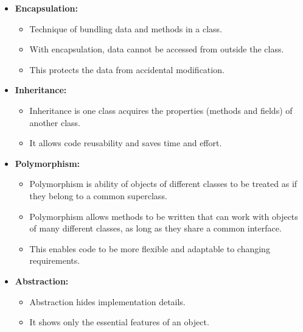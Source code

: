 

\begin{flushleft}
	
	\begin{itemize}
		\item \textbf{Encapsulation:}
		\begin{itemize}
			\item Technique of bundling data and methods in a class. 
			\item With encapsulation, data cannot be accessed from outside the class. 
			\item This protects the data from accidental modification.
			
		\end{itemize}
		
		\item \textbf{Inheritance:}
		\begin{itemize}
			\item Inheritance is one class acquires the properties (methods and fields) of another class.
			\item It allows code reusability and saves time and effort.
		\end{itemize}
	
		\newpage
		\item \textbf{Polymorphism: }
		\begin{itemize}
			\item Polymorphism is ability of objects of different classes to be treated as if they belong to a common superclass. 
			\item Polymorphism allows methods to be written that can work with objects of many different classes, as long as they share a common interface. 
			\item This enables code to be more flexible and adaptable to changing requirements.
			
		\end{itemize}
	
		\item \textbf{Abstraction:}
		\begin{itemize}
			\item Abstraction hides implementation details.
			\item It shows only the essential features of an object. 
		\end{itemize}
		
	
	\end{itemize}
		
	
\end{flushleft}




